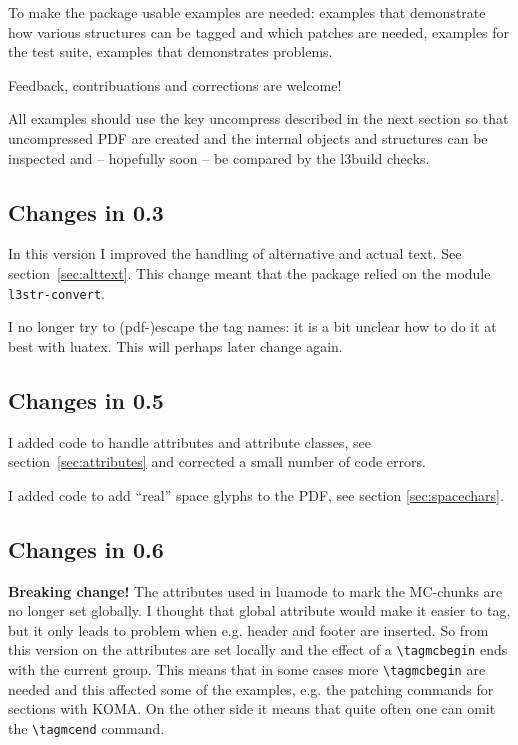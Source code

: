 \documentclass[DIV=12,parskip=half-,bibliography=totoc]{scrartcl}
\newcommand\PrintKeyName[1]{\textsf{#1}}
\newcommand\PDF{PDF}
\begin{document}
To make the package usable examples are needed: examples that demonstrate how various structures can be tagged and which patches are needed, examples for the test suite, examples that demonstrates problems.


\begin{tcolorbox}[before upper=\tagpdfparaOn]
Feedback, contribuations and corrections are welcome!
\end{tcolorbox}


All examples should use the  key \PrintKeyName{uncompress} described in the next section so that uncompressed \PDF{} are created and the internal objects and structures can be inspected and -- hopefully soon -- be compared by the l3build checks.%



\subsection{Changes in 0.3}


In this version I improved the handling of alternative and actual text. See section~\ref{sec:alttext}. This change meant that the package relied on the module \texttt{l3str-convert}.

I no longer try to (pdf-)escape the tag names: it is a bit unclear how to do it at best with luatex. This will perhaps later change again.




\subsection{Changes in 0.5}


I added code to handle attributes and attribute classes, see section~\ref{sec:attributes} and corrected a small number of code errors.

I added code to add \enquote{real} space glyphs to the \PDF{}, see section \ref{sec:spacechars}.



\subsection{Changes in 0.6}



\textbf{Breaking change!} The attributes used in luamode to mark the MC-chunks are no longer set globally. I thought that global attribute would make it easier to tag, but it only leads to problem when e.g. header and footer are inserted. So from this version on the attributes are set locally and the effect of a \verb+\tagmcbegin+ ends with the current group. This means that in some cases more \verb+\tagmcbegin+ are needed and  this affected some of the examples, e.g. the patching commands for sections with KOMA. On the other side it means that quite often one can omit the \verb+\tagmcend+ command.
\end{document}
